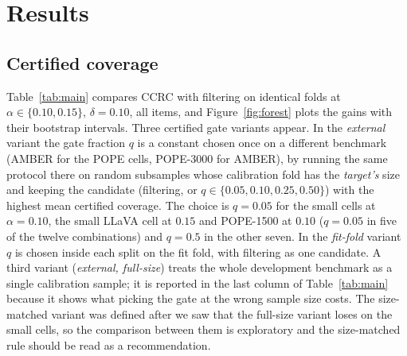 \section{Results}
\label{sec:results}

\subsection{Certified coverage}
\label{sec:main}

Table~\ref{tab:main} compares CCRC with filtering on identical folds at $\alpha\in\{0.10,0.15\}$,
$\delta=0.10$, all items, and Figure~\ref{fig:forest} plots the gains with their bootstrap intervals. Three
certified gate variants appear. In the \emph{external} variant the gate fraction $q$ is a constant chosen once on a
different benchmark (AMBER for the POPE cells, POPE-3000 for AMBER), by running the same protocol there on random
subsamples whose calibration fold has the \emph{target's} size and keeping the candidate (filtering, or
$q\in\{0.05,0.10,0.25,0.50\}$) with the highest mean certified coverage. The choice is $q=0.05$ for
the small cells at $\alpha=0.10$, the small LLaVA cell at $0.15$ and POPE-1500 at $0.10$ ($q=0.05$ in five of the twelve combinations) and $q=0.5$ in the other seven. In the \emph{fit-fold}
variant $q$ is chosen inside each split on the fit fold, with filtering as one candidate. A third variant
(\emph{external, full-size}) treats the whole development benchmark as a single calibration sample; it is
reported in the last column of Table~\ref{tab:main} because it shows what picking the gate at the wrong
sample size costs. The size-matched variant was defined after we saw that the full-size variant loses on the small cells, so
the comparison between them is exploratory and the size-matched rule should be read as a recommendation.

\begin{table}[t]
\centering
\caption{Certified coverage (\%), with the abort rate (\%) in parentheses, $\delta=0.10$, $400$ paired
splits, all-item cohort. Gain is the mean paired difference over splits against filtering; the interval is the
$95\%$ percentile interval from the outer image-level bootstrap (\S\ref{sec:protocol}), and
$P(\text{gain}>0)$ is the fraction of bootstrap datasets with a positive gain. The last column is the gain with the
gate chosen on the development benchmark at its full size.}
\label{tab:main}
\scriptsize
\resizebox{\textwidth}{!}{}
\end{table}

